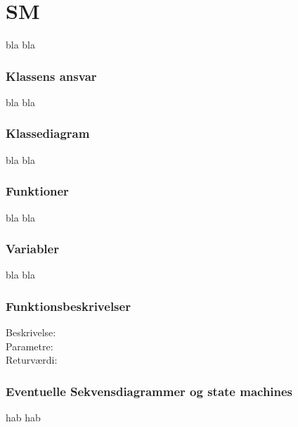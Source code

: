\chapter{SM}
bla bla
\subsection{Klassens ansvar}
bla bla
\subsection{Klassediagram}
bla bla
\subsection{Funktioner}
bla bla
\subsection{Variabler}
bla bla
\subsection{Funktionsbeskrivelser}
Beskrivelse:\\
Parametre:\\
Returværdi:\\
\subsection{Eventuelle Sekvensdiagrammer og state machines}
hab hab